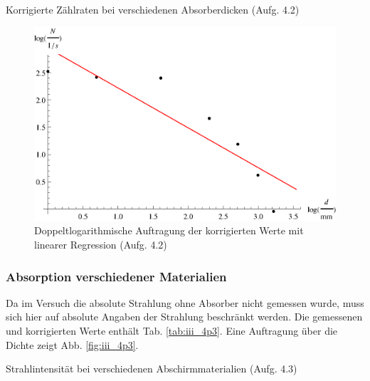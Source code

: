 \begin{table}[p]
\centering
\caption{Korrigierte Zählraten bei verschiedenen Absorberdicken (Aufg. 4.2)}
\label{tab:iii_4p2}

\end{table}

\begin{figure}[p]
\centering
\includegraphics[scale=1.0]{fig/iii_4p2.eps}
\caption{Doppeltlogarithmische Auftragung der korrigierten Werte mit linearer Regression (Aufg. 4.2)}
\label{fig:iii_4p2}
\end{figure}

\subsubsection{Absorption verschiedener Materialien}
Da im Versuch die absolute Strahlung ohne Absorber nicht gemessen wurde, muss sich hier auf absolute Angaben der Strahlung beschränkt werden. Die gemessenen und korrigierten Werte enthält Tab. \ref{tab:iii_4p3}. Eine Auftragung über die Dichte zeigt Abb. \ref{fig:iii_4p3}.

\begin{table}[p]
\centering
\caption{Strahlintensität bei verschiedenen Abschirmmaterialien (Aufg. 4.3)}
\label{tab:iii_4p3}


\end{table}

